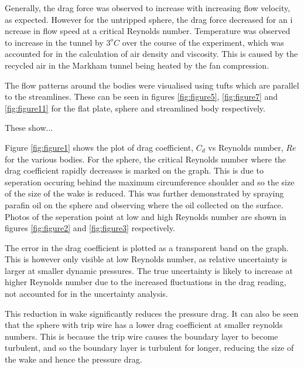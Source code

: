 \documentclass[8pt]{article}
\begin{document}

Generally, the drag force was observed to increase with increasing flow velocity, as expected.
However for the untripped sphere, the drag force decreased for an i ncrease in flow speed at a critical Reynolds number.
Temperature was observed to increase in the tunnel by $3^oC$ over the course of the experiment, which was accounted for in the calculation of air density and viscosity.
This is caused by the recycled air in the Markham tunnel being heated by the fan compression.

The flow patterns around the bodies were visualised using tufts which are parallel to the streamlines.
These can be seen in figures \ref{fig:figure5}, \ref{fig:figure7} and \ref{fig:figure11} for the flat plate, sphere and streamlined body respectively.

These show...


Figure \ref{fig:figure1} shows the plot of drag coefficient, $C_d$ vs Reynolds number, $Re$ for the various bodies. 
For the sphere, the critical Reynolds number where the drag coefficient rapidly decreases is marked on the graph.
This is due to seperation occuring behind the maximum circumference shoulder and so the size of the size of the wake is reduced.
This was further demonstrated by spraying parafin oil on the sphere and observing where the oil collected on the surface.
Photos of the seperation point at low and high Reynolds number are shown in figures \ref{fig:figure2} and \ref{fig:figure3} respectively.

The error in the drag coefficient is plotted as a transparent band on the graph.
This is however only visible at low Reynolds number, as relative uncertainty is larger at smaller dynamic pressures.
The true uncertainty is likely to increase at higher Reynolds number due to the increased fluctuations in the drag reading, not accounted for in the uncertainty analysis.

This reduction in wake significantly reduces the pressure drag.
It can also be seen that the sphere with trip wire has a lower drag coefficient at smaller reynolds numbers.
This is because the trip wire causes the boundary layer to become turbulent, and so the boundary layer is turbulent for longer, reducing the size of the wake and hence the pressure drag.

\end{document}
